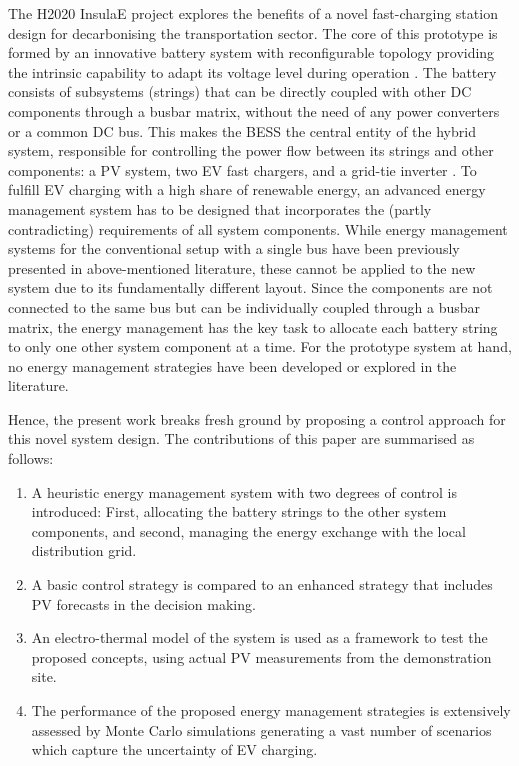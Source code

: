 \documentclass[final,5p,times,twocolumn]{elsarticle}
\begin{document}
The H2020 InsulaE project explores the benefits of a novel fast-charging station design for decarbonising the transportation sector. The core of this prototype is formed by an innovative battery system with reconfigurable topology providing the intrinsic capability to adapt its voltage level during operation \cite{Engelhardt.2020,Engelhardt.2021}. The battery consists of subsystems (strings) that can be directly coupled with other DC components through a busbar matrix, without the need of any power converters or a common DC bus. This makes the BESS the central entity of the hybrid system, responsible for controlling the power flow between its strings and other components: a PV system, two EV fast chargers, and a grid-tie inverter \cite{Gabderakhmanova.2020}. To fulfill EV charging with a high share of renewable energy, an advanced energy management system has to be designed that incorporates the (partly contradicting) requirements of all system components. While energy management systems for the conventional setup with a single bus have been previously presented in above-mentioned literature, these cannot be applied to the new system due to its fundamentally different layout. Since the components are not connected to the same bus but can be individually coupled through a busbar matrix, the energy management has the key task to allocate each battery string to only one other system component at a time. For the prototype system at hand, no energy management strategies have been developed or explored in the literature.

Hence, the present work breaks fresh ground by proposing a control approach for this novel system design. The contributions of this paper are summarised as follows:
\begin{enumerate}[1)]
    \item A heuristic energy management system with two degrees of control is introduced: First, allocating the battery strings to the other system components, and second, managing the energy exchange with the local distribution grid.
    \item A basic control strategy is compared to an enhanced strategy that includes PV forecasts in the decision making.
    \item An electro-thermal model of the system is used as a framework to test the proposed concepts, using actual PV measurements from the demonstration site.
    \item The performance of the proposed energy management strategies is extensively assessed by Monte Carlo simulations generating a vast number of scenarios which capture the uncertainty of EV charging.
\end{enumerate}
\end{document}
